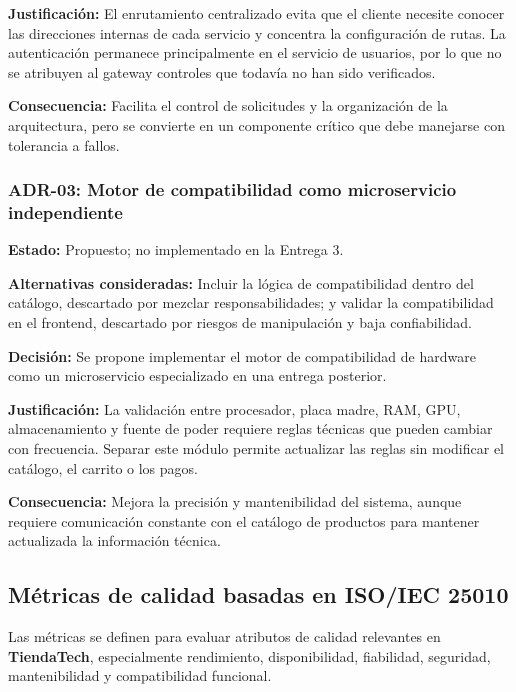 \documentclass[12pt]{article}
\begin{document}
    \textbf{Justificación:} El enrutamiento centralizado evita que el cliente necesite conocer las direcciones internas de cada servicio y concentra la configuración de rutas. La autenticación permanece principalmente en el servicio de usuarios, por lo que no se atribuyen al gateway controles que todavía no han sido verificados.

    \textbf{Consecuencia:} Facilita el control de solicitudes y la organización de la arquitectura, pero se convierte en un componente crítico que debe manejarse con tolerancia a fallos.

    \subsubsection{ADR-03: Motor de compatibilidad como microservicio independiente}

    \textbf{Estado:} Propuesto; no implementado en la Entrega 3.

    \textbf{Alternativas consideradas:} Incluir la lógica de compatibilidad dentro del catálogo, descartado por mezclar responsabilidades; y validar la compatibilidad en el frontend, descartado por riesgos de manipulación y baja confiabilidad.

    \textbf{Decisión:} Se propone implementar el motor de compatibilidad de hardware como un microservicio especializado en una entrega posterior.

    \textbf{Justificación:} La validación entre procesador, placa madre, RAM, GPU, almacenamiento y fuente de poder requiere reglas técnicas que pueden cambiar con frecuencia. Separar este módulo permite actualizar las reglas sin modificar el catálogo, el carrito o los pagos.

    \textbf{Consecuencia:} Mejora la precisión y mantenibilidad del sistema, aunque requiere comunicación constante con el catálogo de productos para mantener actualizada la información técnica.

    \subsection{Métricas de calidad basadas en ISO/IEC 25010}

    Las métricas se definen para evaluar atributos de calidad relevantes en \textbf{TiendaTech}, especialmente rendimiento, disponibilidad, fiabilidad, seguridad, mantenibilidad y compatibilidad funcional.
\end{document}

